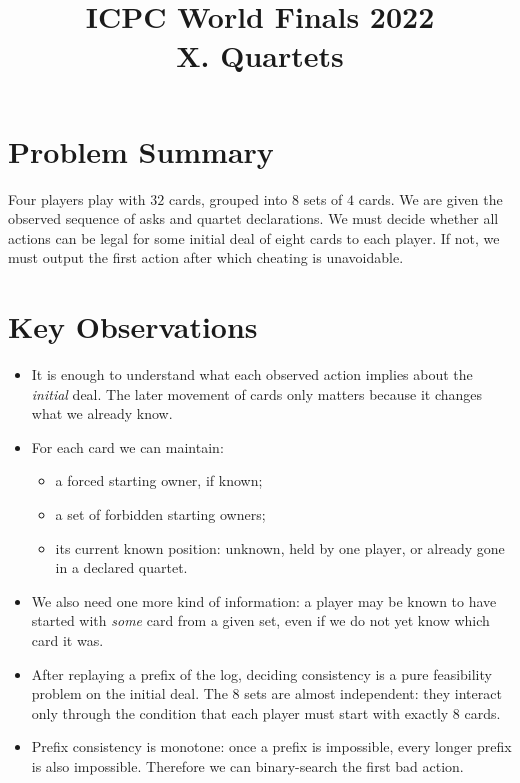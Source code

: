 \documentclass[11pt]{article}
\title{ICPC World Finals 2022\\X. Quartets}
\author{}
\date{}
\begin{document}
\maketitle

\section*{Problem Summary}

Four players play with $32$ cards, grouped into $8$ sets of $4$ cards. We are given the observed
sequence of asks and quartet declarations. We must decide whether all actions can be legal for
some initial deal of eight cards to each player. If not, we must output the first action after which
cheating is unavoidable.

\section*{Key Observations}

\begin{itemize}[leftmargin=*]
    \item It is enough to understand what each observed action implies about the \emph{initial}
    deal. The later movement of cards only matters because it changes what we already know.
    \item For each card we can maintain:
    \begin{itemize}[leftmargin=*]
        \item a forced starting owner, if known;
        \item a set of forbidden starting owners;
        \item its current known position: unknown, held by one player, or already gone in a declared
        quartet.
    \end{itemize}
    \item We also need one more kind of information: a player may be known to have started with
    \emph{some} card from a given set, even if we do not yet know which card it was.
    \item After replaying a prefix of the log, deciding consistency is a pure feasibility problem on the
    initial deal. The $8$ sets are almost independent: they interact only through the condition that
    each player must start with exactly $8$ cards.
    \item Prefix consistency is monotone: once a prefix is impossible, every longer prefix is also
    impossible. Therefore we can binary-search the first bad action.
\end{itemize}
\end{document}
